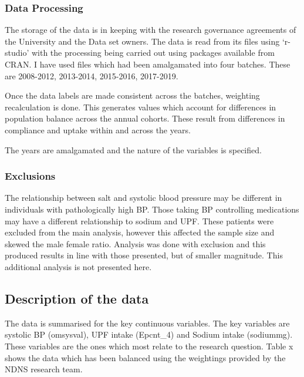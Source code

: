 \documentclass[
]{article}
\begin{document}
\hypertarget{data-processing}{%
\subsubsection{Data Processing}\label{data-processing}}

The storage of the data is in keeping with the research governance
agreements of the University and the Data set owners. The data is read
from its files using `r-studio' with the processing being carried out
using packages available from CRAN. I have used files which had been
amalgamated into four batches. These are 2008-2012, 2013-2014,
2015-2016, 2017-2019.

Once the data labels are made consistent across the batches, weighting
recalculation is done. This generates values which account for
differences in population balance across the annual cohorts. These
result from differences in compliance and uptake within and across the
years.

The years are amalgamated and the nature of the variables is specified.

\hypertarget{exclusions}{%
\subsubsection{Exclusions}\label{exclusions}}

The relationship between salt and systolic blood pressure may be
different in individuals with pathologically high BP. Those taking BP
controlling medications may have a different relationship to sodium and
UPF. These patients were excluded from the main analysis, however this
affected the sample size and skewed the male female ratio. Analysis was
done with exclusion and this produced results in line with those
presented, but of smaller magnitude. This additional analysis is not
presented here.

\hypertarget{description-of-the-data}{%
\subsection{Description of the data}\label{description-of-the-data}}

The data is summarised for the key continuous variables. The key
variables are systolic BP (omsysval), UPF intake (Epcnt\_4) and Sodium
intake (sodiummg). These variables are the ones which most relate to the
research question. Table x shows the data which has been balanced using
the weightings provided by the NDNS research team.
\end{document}
